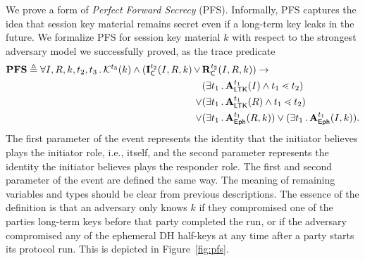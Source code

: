 We prove a form of \emph{Perfect Forward Secrecy} (PFS).
%
Informally, PFS captures the idea that session key material remains secret
even if a long-term key leaks in the future.
%
We formalize PFS for session key material $k$ with respect to the strongest
adversary model we successfully proved, as the trace predicate
%
\begin{align*}
    \mathbf{PFS} \triangleq
    \forall I, R, k, t_2, t_3\operatorname{.}
    \mathcal{K}^{t_3}(k) \land (\mathbf{I}_{\textsf{C}}^{t_2}(I, R, k)\, \lor\, & \mathbf{R}_{\textsf{C}}^{t_2}(I, R, k))
    \rightarrow\\
    &(\exists t_1\operatorname{.} \mathbf{A}_{\textsf{LTK}}^{t_1}(I) \land t_1 \lessdot t_2)\\
    \lor&(\exists t_1\operatorname{.} \mathbf{A}_{\textsf{LTK}}^{t_1}(R) \land t_1 \lessdot t_2)\\
    \lor&(\exists t_1\operatorname{.} \mathbf{A}_{\textsf{Eph}}^{t_1}(R, k))
    \lor(\exists t_1\operatorname{.} \mathbf{A}_{\textsf{Eph}}^{t_1}(I, k)).
\end{align*}
%
The first parameter of the \mIComplete{} event represents the
identity that the initiator believes plays the initiator role, i.e., itself,
and the second parameter represents the identity the initiator believes plays
the responder role.
%
The first and second parameter of the \mRComplete{} event are defined the same
way.
%
The meaning of remaining variables and types should be clear from previous
descriptions.
%
The essence of the definition is that an adversary only knows $k$ if they
compromised one of the
parties long-term keys before that party completed the run, or if the adversary
compromised any of the ephemeral DH half-keys at any time after a party starts
its protocol run.
%
This is depicted in Figure~\ref{fig:pfs}.
%
